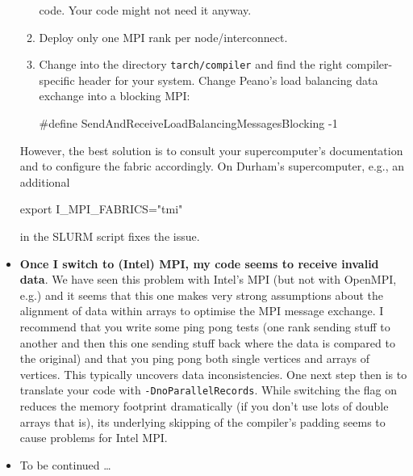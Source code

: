 \begin{itemize}
\begin{enumerate}
      code. Your code might not need it anyway.
      \item Deploy only one MPI rank per node/interconnect.
      \item Change into the directory \texttt{tarch/compiler} and find the right
      compiler-specific header for your system. Change Peano's load balancing
      data exchange into a blocking MPI:
      \begin{code}
      #define SendAndReceiveLoadBalancingMessagesBlocking    -1
      \end{code}
    \end{enumerate}
    However, the best solution is to consult your supercomputer's documentation
    and to configure the fabric accordingly. On Durham's supercomputer, e.g., an
    additional
    \begin{code}
    export I_MPI_FABRICS="tmi"
    \end{code} 
    in the SLURM script fixes the issue.
  \item \textbf{ Once I switch to (Intel) MPI, my code seems to receive invalid
    data}. We have seen this problem with Intel's MPI (but not with OpenMPI,
    e.g.) and it seems that this one makes very strong assumptions about the
    alignment of data within arrays to optimise the MPI message exchange. I
    recommend that you write some ping pong tests (one rank sending stuff to
    another and then this one sending stuff back where the data is compared to
    the original) and that you ping pong both single vertices and arrays of
    vertices. This typically uncovers data inconsistencies. One next step then
    is to translate your code with \texttt{-DnoParallelRecords}. While switching
    the flag on reduces the memory footprint dramatically (if you don't use
    lots of double arrays that is), its underlying skipping of the compiler's
    padding seems to cause problems for Intel MPI.
  \item To be continued \ldots
\end{itemize}


